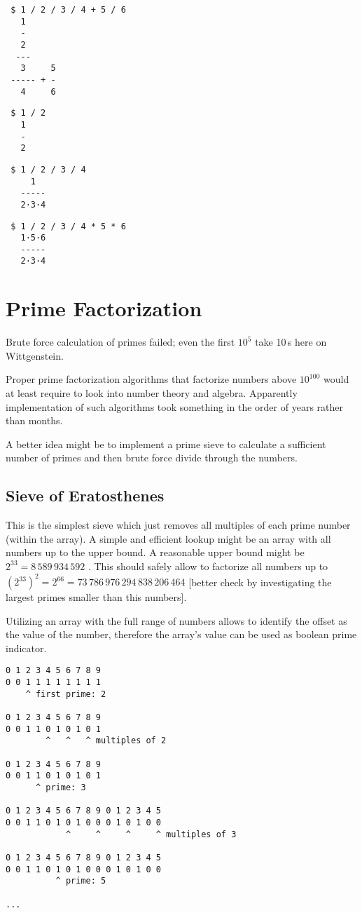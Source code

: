 \documentclass[a4paper,10pt]{article}
\begin{document}
\begin{verbatim}
 $ 1 / 2 / 3 / 4 + 5 / 6
   1
   -
   2
  ---
   3     5
 ----- + -
   4     6
\end{verbatim}


\begin{verbatim}
 $ 1 / 2
   1
   -
   2
\end{verbatim}


\begin{verbatim}
 $ 1 / 2 / 3 / 4
     1
   -----
   2·3·4
\end{verbatim}


\begin{verbatim}
 $ 1 / 2 / 3 / 4 * 5 * 6
   1·5·6
   -----
   2·3·4
\end{verbatim}



\section{Prime Factorization}

Brute force calculation of primes failed;
even the first $10^5$ take 10\,s here on Witt\-gen\-stein.

Proper prime factorization algorithms that factorize numbers above $10^{100}$ would at least require to look into number theory and algebra.
Apparently implementation of such algorithms took something in the order of years rather than months.

A better idea might be to implement a prime sieve to calculate a sufficient number of primes and then brute force divide through the numbers.


\subsection{Sieve of Eratosthenes}
This is the simplest sieve which just removes all multiples of each prime number (within the array).
A simple and efficient lookup might be an array with all numbers up to the upper bound.
A reasonable upper bound might be $2^{33} = 8\,589\,934\,592$ .
This should safely allow to factorize all numbers up to $(2^{33})^2 = 2^{66} = 73\,786\,976\,294\,838\,206\,464$
[better check by investigating the largest primes smaller than this numbers].

Utilizing an array with the full range of numbers allows to identify the offset as the value of the number,
therefore the array's value can be used as boolean prime indicator.

\begin{verbatim}
0 1 2 3 4 5 6 7 8 9
0 0 1 1 1 1 1 1 1 1
    ^ first prime: 2

0 1 2 3 4 5 6 7 8 9
0 0 1 1 0 1 0 1 0 1
        ^   ^   ^ multiples of 2

0 1 2 3 4 5 6 7 8 9
0 0 1 1 0 1 0 1 0 1
      ^ prime: 3

0 1 2 3 4 5 6 7 8 9 0 1 2 3 4 5
0 0 1 1 0 1 0 1 0 0 0 1 0 1 0 0
            ^     ^     ^     ^ multiples of 3

0 1 2 3 4 5 6 7 8 9 0 1 2 3 4 5
0 0 1 1 0 1 0 1 0 0 0 1 0 1 0 0
          ^ prime: 5

...
\end{verbatim}
\end{document}
